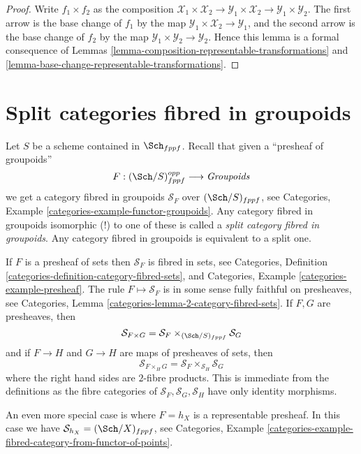 \begin{proof}
Write $f_1 \times f_2$ as the composition
$\mathcal{X}_1 \times \mathcal{X}_2 \to
\mathcal{Y}_1 \times \mathcal{X}_2 \to
\mathcal{Y}_1 \times \mathcal{Y}_2$.
The first arrow is the base change of $f_1$ by the map
$\mathcal{Y}_1 \times \mathcal{X}_2 \to \mathcal{Y}_1$, and the second arrow
is the base change of $f_2$ by the map
$\mathcal{Y}_1 \times \mathcal{Y}_2 \to \mathcal{Y}_2$.
Hence this lemma is a formal
consequence of Lemmas \ref{lemma-composition-representable-transformations}
and \ref{lemma-base-change-representable-transformations}.
\end{proof}



\section{Split categories fibred in groupoids}
\label{section-split}

\noindent
Let $S$ be a scheme contained in $\Sch_{fppf}$.
Recall that given a ``presheaf of groupoids''
$$
F : (\Sch/S)_{fppf}^{opp} \longrightarrow \textit{Groupoids}
$$
we get a category fibred in groupoids $\mathcal{S}_F$ over
$(\Sch/S)_{fppf}$, see
Categories, Example \ref{categories-example-functor-groupoids}.
Any category fibred in groupoids isomorphic (!) to one of these
is called a {\it split category fibred in groupoids}.
Any category fibred in groupoids is equivalent to a split one.

\medskip\noindent
If $F$ is a presheaf of sets then $\mathcal{S}_F$ is
fibred in sets, see
Categories,
Definition \ref{categories-definition-category-fibred-sets},
and
Categories, Example \ref{categories-example-presheaf}.
The rule $F \mapsto \mathcal{S}_F$ is in some sense fully faithful
on presheaves, see
Categories, Lemma \ref{categories-lemma-2-category-fibred-sets}.
If $F, G$ are presheaves, then
$$
\mathcal{S}_{F \times G}
=
\mathcal{S}_F \times_{(\Sch/S)_{fppf}} \mathcal{S}_G
$$
and if $F \to H$ and $G \to H$ are maps of presheaves of sets, then
$$
\mathcal{S}_{F \times_H G} =
\mathcal{S}_F \times_{\mathcal{S}_H} \mathcal{S}_G
$$
where the right hand sides are $2$-fibre products. This is immediate
from the definitions as the fibre categories of
$\mathcal{S}_F, \mathcal{S}_G, \mathcal{S}_H$ have only identity morphisms.

\medskip\noindent
An even more special case is where $F = h_X$ is a representable
presheaf. In this case we have
$\mathcal{S}_{h_X} = (\Sch/X)_{fppf}$, see
Categories,
Example \ref{categories-example-fibred-category-from-functor-of-points}.

